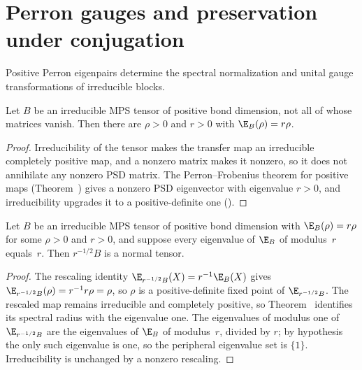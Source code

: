 \section{Perron gauges and preservation under conjugation}
\label{sec:app_canonical_perron_gauges}

Positive Perron eigenpairs determine the spectral normalization and unital
gauge transformations of irreducible blocks.

\begin{lemma}
    \label{lem:irreducible_transfer_perron_pair}
    \leanok
    Let $B$ be an irreducible MPS tensor of positive bond dimension, not all
    of whose matrices vanish. Then there are $\rho>0$ and $r>0$ with
    $\E_B(\rho)=r\rho$.
\end{lemma}

\begin{proof}
    \leanok

    Irreducibility of the tensor makes the transfer map an irreducible
    completely positive map, and a nonzero matrix makes it nonzero, so it
    does not annihilate any nonzero PSD matrix. The Perron--Frobenius theorem
    for positive maps (Theorem~\cite[``Positive-eigenvalue specialization'']{QICLean2026Blueprint}) gives a
    nonzero PSD eigenvector with eigenvalue $r>0$, and irreducibility upgrades
    it to a positive-definite one
    (\cite[Theorem~6.3(2)--(3)]{Wolf2012Quantum}).
\end{proof}

\begin{lemma}
    \label{lem:irreducible_block_spectral_normalization}
    \leanok
    Let $B$ be an irreducible MPS tensor of positive bond dimension with
    $\E_B(\rho)=r\rho$ for some $\rho>0$ and $r>0$, and suppose every
    eigenvalue of $\E_B$ of modulus~$r$ equals~$r$. Then $r^{-1/2}B$ is a
    normal tensor.
\end{lemma}

\begin{proof}
    \leanok
    The rescaling identity $\E_{r^{-1/2}B}(X)=r^{-1}\E_B(X)$ gives
    $\E_{r^{-1/2}B}(\rho)=r^{-1}r\rho=\rho$, so $\rho$ is a
    positive-definite fixed point of $\E_{r^{-1/2}B}$. The rescaled map
    remains irreducible and completely positive, so
    Theorem~\cite[``Spectral radius is the Perron eigenvalue'']{QICLean2026Blueprint} identifies its spectral radius
    with the eigenvalue one. The eigenvalues of modulus one of
    $\E_{r^{-1/2}B}$ are the eigenvalues of $\E_B$ of modulus~$r$, divided by
    $r$; by hypothesis the only such eigenvalue is one, so the peripheral
    eigenvalue set is $\{1\}$. Irreducibility is unchanged by a nonzero
    rescaling.
\end{proof}

